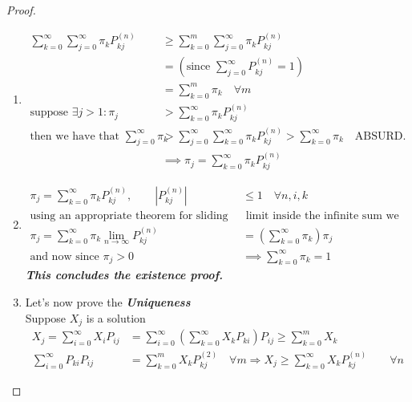 \begin{proof}
\begin{enumerate}
			\item
			\begin{equation*}
				\begin{split}
					\sum\limits_{k=0}^\infty \sum\limits_{j=0}^\infty \pi_k P_{kj}^{(n)} &\geq
					\sum\limits_{k=0}^m \sum\limits_{j=0}^\infty \pi_k P_{kj}^{(n)}  \\
					&=(\text{since } \sum\limits_{j=0}^\infty P_{kj}^{(n)} = 1 )\\
					&=\sum\limits_{k=0}^m \pi_k \quad \forall m\\
					\text{suppose } \exists j > 1 : \pi_j &> \sum\limits_{k=0}^\infty \pi_k P_{kj}^{(n)} \\
					\text{then we have that } \sum\limits_{j=0}^\infty \pi_k &> \sum\limits_{j=0}^\infty \sum\limits_{k=0}^\infty \pi_k P_{kj}^{(n)} > \sum\limits_{k=0}^\infty \pi_k \quad \text{ABSURD.} \\
					&\implies \pi_j = \sum\limits_{k=0}^\infty \pi_k P_{kj}^{(n)}
				\end{split}
			\end{equation*}

			\item
			\begin{equation*}
				\begin{split}
			 		\pi_j = \sum\limits_{k=0}^\infty \pi_k P_{kj}^{(n)}, \qquad |P_{kj}^{(n)}| &\leq 1 \quad \forall n,i,k \\
					\text{using an appropriate theorem for sliding the}&\text{ limit inside the infinite sum we have:}\\
					\pi_j = \sum\limits_{k=0}^\infty  \pi_k \lim_{n\to\infty} P_{kj}^{(n)} &= (\sum\limits_{k=0}^\infty \pi_k) \pi_j\\
					\text{and now since $\pi_j>0$}
					&\implies \sum\limits_{k=0}^\infty \pi_k = 1
				\end{split}
			\end{equation*}
			\textbf{\textit{This concludes the existence proof.}}

			\item
			Let's now prove the \textbf{\textit{Uniqueness}} \\
			Suppose $X_j$ is a solution
			\begin{equation}
				\begin{split}
					X_j =
					 \sum\limits_{i=0}^\infty X_i P_{ij} &=
					 \sum\limits_{i=0}^\infty ( \sum\limits_{k=0}^\infty X_k P_{ki} ) P_{ij} \geq
					 \sum\limits_{k=0}^m X_k \\
					 \sum\limits_{i=0}^\infty P_{ki} P_{ij} &= \sum\limits_{k=0}^m X_k P_{kj}^{(2)}
					 \quad \forall m
					 \Rightarrow X_j \geq \sum\limits_{k=0}^\infty X_k P_{kj}^{(n)}\qquad \forall n
				\end{split}
			\end{equation}


\end{enumerate}
\end{proof}
